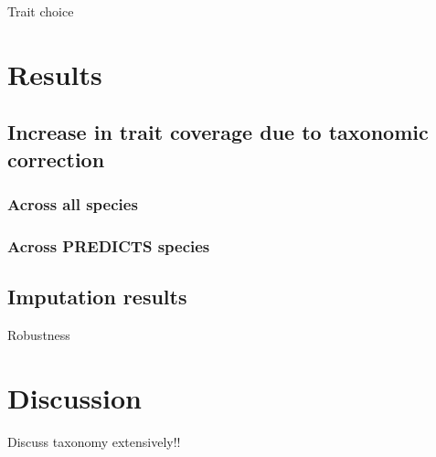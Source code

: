 Trait choice

\section{Results}

\subsection{Increase in trait coverage due to taxonomic correction}

\subsubsection{Across all species}
\subsubsection{Across PREDICTS species}

\subsection{Imputation results}
Robustness

\section{Discussion}
Discuss taxonomy extensively!!

